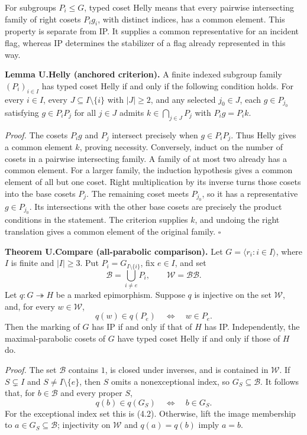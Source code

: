 \documentclass[
  11pt,
  a4paper,
]{article}
\newcounter{none} %
\begin{document}
For subgroups \(P_i\leq G\), typed coset Helly means that every pairwise
intersecting family of right cosets \(P_i g_i\), with distinct indices,
has a common element. This property is separate from IP. It supplies a
common representative for an incident flag, whereas IP determines the
stabilizer of a flag already represented in this way.

\textbf{Lemma U.Helly (anchored criterion).} A finite indexed subgroup
family \((P_i)_{i\in I}\) has typed coset Helly if and only if the
following condition holds. For every \(i\in I\), every
\(J\subseteq I\setminus\{i\}\) with \(|J|\geq2\), and any selected
\(j_0\in J\), each \(g\in P_{j_0}\) satisfying \(g\in P_iP_j\) for all
\(j\in J\) admits \(k\in\bigcap_{j\in J}P_j\) with \(P_i g=P_i k\).

\emph{Proof.} The cosets \(P_i g\) and \(P_j\) intersect precisely when
\(g\in P_iP_j\). Thus Helly gives a common element \(k\), proving
necessity. Conversely, induct on the number of cosets in a pairwise
intersecting family. A family of at most two already has a common
element. For a larger family, the induction hypothesis gives a common
element of all but one coset. Right multiplication by its inverse turns
those cosets into the base cosets \(P_j\). The remaining coset meets
\(P_{j_0}\), so it has a representative \(g\in P_{j_0}\). Its
intersections with the other base cosets are precisely the product
conditions in the statement. The criterion supplies \(k\), and undoing
the right translation gives a common element of the original family.
\(\square\)

\textbf{Theorem U.Compare (all-parabolic comparison).} Let
\(G=\langle r_i:i\in I\rangle\), where \(I\) is finite and \(|I|\geq3\).
Put \(P_i=G_{I\setminus\{i\}}\), fix \(e\in I\), and set \[
\mathcal B=\bigcup_{i\ne e}P_i,\qquad
\mathcal W=\mathcal B\mathcal B.
\tag{4.1}
\] Let \(q:G\twoheadrightarrow H\) be a marked epimorphism. Suppose
\(q\) is injective on the set \(\mathcal W\), and, for every
\(w\in\mathcal W\), \[
q(w)\in q(P_e)\quad\Longleftrightarrow\quad w\in P_e.
\tag{4.2}
\] Then the marking of \(G\) has IP if and only if that of \(H\) has IP.
Independently, the maximal-parabolic cosets of \(G\) have typed coset
Helly if and only if those of \(H\) do.

\emph{Proof.} The set \(\mathcal B\) contains \(1\), is closed under
inverses, and is contained in \(\mathcal W\). If \(S\subsetneq I\) and
\(S\ne I\setminus\{e\}\), then \(S\) omits a nonexceptional index, so
\(G_S\subseteq\mathcal B\). It follows that, for \(b\in\mathcal B\) and
every proper \(S\), \[
q(b)\in q(G_S)\quad\Longleftrightarrow\quad b\in G_S.
\tag{4.3}
\] For the exceptional index set this is (4.2). Otherwise, lift the
image membership to \(a\in G_S\subseteq\mathcal B\); injectivity on
\(\mathcal W\) and \(q(a)=q(b)\) imply \(a=b\).
\end{document}
